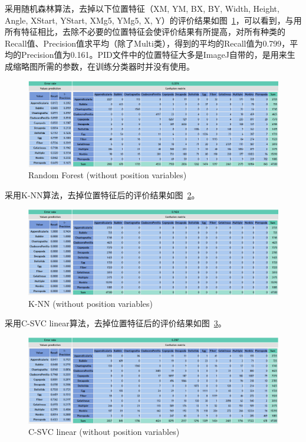 \documentclass[12pt]{article}
\begin{document}
采用随机森林算法，去掉以下位置特征（XM, YM, BX, BY, Width, Height, Angle, XStart, YStart, XMg5, YMg5, X, Y）的评价结果如图~\ref{fig: withoutposition}，可以看到，与用所有特征相比，去除不必要的位置特征会使评价结果有所提高，对所有种类的Recall值、Precision值求平均（除了Multi类），得到的平均的Recall值为0.799，平均的Precision值为0.161。PID文件中的位置特征大多是ImageJ自带的，是用来生成缩略图所需的参数，在训练分类器时并没有使用。

\begin{figure}[!ht]
\centering
\includegraphics[width=1.0\textwidth]{withoutposition.png}
\caption{Random Forest (without position variables)}
\label{fig: withoutposition}
\end{figure} 

采用K-NN算法，去掉位置特征后的评价结果如图~\ref{fig: KNN}。

\begin{figure}[!ht]
\centering
\includegraphics[width=1.0\textwidth]{KNN.png}
\caption{K-NN (without position variables)}
\label{fig: KNN}
\end{figure} 

采用C-SVC linear算法，去掉位置特征后的评价结果如图~\ref{fig: C-SVClinear}。

\begin{figure}[!ht]
\centering
\includegraphics[width=1.0\textwidth]{C-SVClinear.png}
\caption{C-SVC linear (without position variables)}
\label{fig: C-SVClinear}
\end{figure} 
\end{document}
